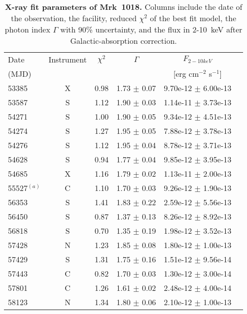 \begin{table}
\centering
\caption{{ \bf X-ray fit parameters of Mrk~1018. } Columns include the date of the observation, the facility, reduced $\chi ^2$ of the best fit model, the photon index $\Gamma$ with 90\% uncertainty, and the flux in 2-10~keV after Galactic-absorption correction. }
\label{tab:table1}

\begin{tabular}{lccccc}
\hline
\hline
 
  Date   &   Instrument  & $\chi ^2$  &$\Gamma$  &  $F_{2-10keV}$  & \\ 
  (MJD)  &                         &                      &                    &  [erg cm$^{-2}$ s$^{-1}$] &      
 \\  \hline

53385 & X & 0.98 & 1.73  $\pm$  0.07 & 9.70e-12  $\pm$  6.00e-13 &  \\ 
53587 & S & 1.12 & 1.90  $\pm$  0.03 & 1.14e-11  $\pm$  3.73e-13 &  \\ 
54271 & S & 1.00 & 1.90  $\pm$  0.05 & 9.34e-12  $\pm$  4.51e-13 &  \\ 
54274 & S & 1.27 & 1.95  $\pm$  0.05 & 7.88e-12  $\pm$  3.78e-13 &  \\ 
54276 & S & 1.12 & 1.95  $\pm$  0.04 & 8.78e-12  $\pm$  3.71e-13 &  \\ 
54628 & S & 0.94 & 1.77  $\pm$  0.04 & 9.85e-12  $\pm$  3.95e-13 &  \\ 
54685 & X & 1.16 & 1.79  $\pm$  0.02 & 1.13e-11  $\pm$  2.00e-13 &  \\ 
55527$^{(a)}$ & C & 1.10 & 1.70  $\pm$  0.03 & 9.26e-12  $\pm$  1.90e-13 &            \\ 
56353 & S & 1.41 & 1.83  $\pm$  0.22 & 2.59e-12  $\pm$  5.56e-13 &  \\ 
56450 & S & 0.87 & 1.37  $\pm$  0.13 & 8.26e-12  $\pm$  8.92e-13 &  \\ 
56818 & S & 0.70 & 1.35  $\pm$  0.19 & 1.98e-12  $\pm$  3.52e-13 &  \\ 
57428 & N & 1.23 & 1.85  $\pm$  0.08 & 1.80e-12  $\pm$  1.00e-13 &  \\ 
57429 & S & 1.31 & 1.75  $\pm$  0.16 & 1.51e-12  $\pm$  9.56e-14 &  \\ 
57443 & C & 0.82 & 1.70  $\pm$  0.03 & 1.30e-12  $\pm$  3.00e-14 &  \\ 
57801 & C & 1.26 & 1.61  $\pm$  0.02 & 2.48e-12  $\pm$  4.00e-14 &  \\ 
58123 & N & 1.34 & 1.80  $\pm$  0.06 & 2.10e-12  $\pm$  1.00e-13 &  \\ 

\end{tabular}
\end{table}
